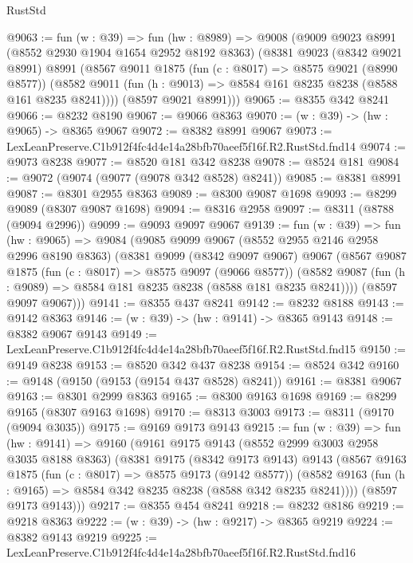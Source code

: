 \begin{lexlean}{RustStd}
\begin{coremodule}
@9063 := fun (w : @39) =>
  fun (hw : @8989) =>
  @9008
    (@9009
      @9023
      @8991
      (@8552 @2930 @1904 @1654 @2952 @8192 @8363)
      (@8381
        @9023
        (@8342 @9021 @8991)
        @8991
        (@8567
          @9011
          @1875
          (fun (c : @8017) => @8575 @9021 (@8990 @8577))
          (@8582 @9011 (fun (h : @9013) => @8584 @161 @8235 @8238 (@8588 @161 @8235 @8241))))
        (@8597 @9021 @8991)))
@9065 := @8355 @342 @8241
@9066 := @8232 @8190
@9067 := @9066 @8363
@9070 := (w : @39) -> (hw : @9065) -> @8365 @9067
@9072 := @8382 @8991 @9067
@9073 := LexLeanPreserve.C1b912f4fc4d4e14a28bfb70aeef5f16f.R2.RustStd.fnd14
@9074 := @9073 @8238
@9077 := @8520 @181 @342 @8238
@9078 := @8524 @181
@9084 := @9072 (@9074 (@9077 (@9078 @342 @8528) @8241))
@9085 := @8381 @8991
@9087 := @8301 @2955 @8363
@9089 := @8300 @9087 @1698
@9093 := @8299 @9089 (@8307 @9087 @1698)
@9094 := @8316 @2958
@9097 := @8311 (@8788 (@9094 @2996))
@9099 := @9093 @9097 @9067
@9139 := fun (w : @39) =>
  fun (hw : @9065) =>
  @9084
    (@9085
      @9099
      @9067
      (@8552 @2955 @2146 @2958 @2996 @8190 @8363)
      (@8381
        @9099
        (@8342 @9097 @9067)
        @9067
        (@8567
          @9087
          @1875
          (fun (c : @8017) => @8575 @9097 (@9066 @8577))
          (@8582 @9087 (fun (h : @9089) => @8584 @181 @8235 @8238 (@8588 @181 @8235 @8241))))
        (@8597 @9097 @9067)))
@9141 := @8355 @437 @8241
@9142 := @8232 @8188
@9143 := @9142 @8363
@9146 := (w : @39) -> (hw : @9141) -> @8365 @9143
@9148 := @8382 @9067 @9143
@9149 := LexLeanPreserve.C1b912f4fc4d4e14a28bfb70aeef5f16f.R2.RustStd.fnd15
@9150 := @9149 @8238
@9153 := @8520 @342 @437 @8238
@9154 := @8524 @342
@9160 := @9148 (@9150 (@9153 (@9154 @437 @8528) @8241))
@9161 := @8381 @9067
@9163 := @8301 @2999 @8363
@9165 := @8300 @9163 @1698
@9169 := @8299 @9165 (@8307 @9163 @1698)
@9170 := @8313 @3003
@9173 := @8311 (@9170 (@9094 @3035))
@9175 := @9169 @9173 @9143
@9215 := fun (w : @39) =>
  fun (hw : @9141) =>
  @9160
    (@9161
      @9175
      @9143
      (@8552 @2999 @3003 @2958 @3035 @8188 @8363)
      (@8381
        @9175
        (@8342 @9173 @9143)
        @9143
        (@8567
          @9163
          @1875
          (fun (c : @8017) => @8575 @9173 (@9142 @8577))
          (@8582 @9163 (fun (h : @9165) => @8584 @342 @8235 @8238 (@8588 @342 @8235 @8241))))
        (@8597 @9173 @9143)))
@9217 := @8355 @454 @8241
@9218 := @8232 @8186
@9219 := @9218 @8363
@9222 := (w : @39) -> (hw : @9217) -> @8365 @9219
@9224 := @8382 @9143 @9219
@9225 := LexLeanPreserve.C1b912f4fc4d4e14a28bfb70aeef5f16f.R2.RustStd.fnd16

\end{coremodule}
\end{lexlean}
